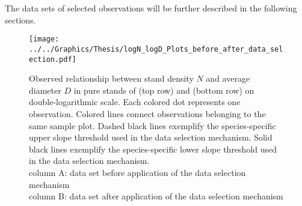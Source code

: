 The data sets of selected observations will be further described in the following sections.



\begin{figure}[H]
  \centering
  \texttt{[image: ../../Graphics/Thesis/logN\_logD\_Plots\_before\_after\_data\_selection.pdf]}
  \caption{Observed relationship between stand density \(N\) and average diameter \(D\) in pure stands of \Beech{} (top row) and \Spruce{} (bottom row) on double-logarithmic scale.  Each colored dot represents one observation.  Colored lines connect observations belonging to the same sample plot.  Dashed black lines exemplify the species-specific upper slope threshold used in the data selection mechanism.  Solid black lines exemplify the species-specific lower slope threshold used in the data selection mechanism.  \\
    column A: data set before application of the data selection mechanism \\
    column B: data set after application of the data selection mechanism}
  \label{fig:logNlogDPlotsBeforeAfterDataSelection}
\end{figure}

